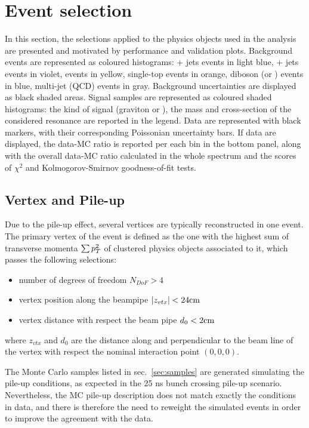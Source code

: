 \section{Event selection}
\label{sec:objects}

In this section, the selections applied to the physics objects used in the analysis are presented and motivated by performance and validation plots. Background events are represented as coloured histograms: \Z + jets events in light blue, \W + jets events in violet, \ttbar events in yellow, single-top events in orange, diboson (or \VV) events in blue, multi-jet (QCD) events in gray. Background uncertainties are displayed as black shaded areas. Signal samples are represented as coloured shaded histograms: the kind of signal (graviton or \Wp), the mass and cross-section of the considered resonance are reported in the legend. Data are represented with black markers, with their corresponding Poissonian uncertainty bars. If data are displayed, the data-MC ratio is reported per each bin in the bottom panel, along with the overall data-MC ratio calculated in the whole spectrum and the scores of $\chi^2$ and Kolmogorov-Smirnov goodness-of-fit tests.

\subsection{Vertex and Pile-up}
Due to the pile-up effect, several vertices are typically reconstructed in one event. The primary vertex of the event is defined as the one with the highest sum of transverse momenta $\sum p_T^2$ of clustered physics objects associated to it, which passes the following selections:
\begin{itemize}
  \item number of degrees of freedom $N_{DoF}>4$
  \item vertex position along the beampipe $|z_{vtx}|<24\text{cm}$
  \item vertex distance with respect the beam pipe $d_0<2\text{cm}$
\end{itemize}
where $z_{vtx}$ and $d_0$ are the distance along and perpendicular to the beam line of the vertex with respect the nominal interaction point $(0,0,0)$.

\noindent The Monte Carlo samples listed in sec.~\ref{sec:samples} are generated simulating the pile-up conditions, as expected in the 25 ns bunch crossing pile-up scenario. Nevertheless, the MC pile-up description does not match exactly the conditions in data, and there is therefore the need to reweight the simulated events in order to improve the agreement with the data. 

